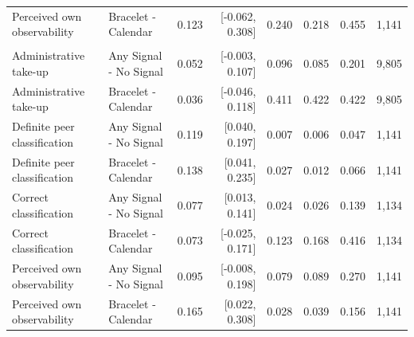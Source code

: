 \begin{tabular}{llrrrrrr}
Perceived own observability & Bracelet - Calendar & 0.123 & [-0.062, 0.308] & 0.240 & 0.218 & 0.455 & 1,141 \\
\addlinespace
\multicolumn{8}{l}{\textit{Realized distance (per km)}} \\
Administrative take-up & Any Signal - No Signal & 0.052 & [-0.003, 0.107] & 0.096 & 0.085 & 0.201 & 9,805 \\
Administrative take-up & Bracelet - Calendar & 0.036 & [-0.046, 0.118] & 0.411 & 0.422 & 0.422 & 9,805 \\
Definite peer classification & Any Signal - No Signal & 0.119 & [0.040, 0.197] & 0.007 & 0.006 & 0.047 & 1,141 \\
Definite peer classification & Bracelet - Calendar & 0.138 & [0.041, 0.235] & 0.027 & 0.012 & 0.066 & 1,141 \\
Correct classification & Any Signal - No Signal & 0.077 & [0.013, 0.141] & 0.024 & 0.026 & 0.139 & 1,134 \\
Correct classification & Bracelet - Calendar & 0.073 & [-0.025, 0.171] & 0.123 & 0.168 & 0.416 & 1,134 \\
Perceived own observability & Any Signal - No Signal & 0.095 & [-0.008, 0.198] & 0.079 & 0.089 & 0.270 & 1,141 \\
Perceived own observability & Bracelet - Calendar & 0.165 & [0.022, 0.308] & 0.028 & 0.039 & 0.156 & 1,141 \\
\bottomrule
\end{tabular}
